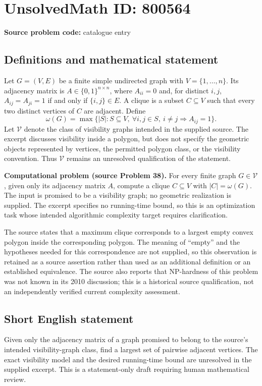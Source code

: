 \documentclass[11pt]{article}
\begin{document}
\section*{UnsolvedMath ID: 800564}
\textbf{Source problem code:} catalogue entry
\subsection{Definitions and mathematical statement}
Let \(G=(V,E)\) be a finite simple undirected graph with \(V=\{1,\ldots,n\}\). Its adjacency matrix is \(A\in\{0,1\}^{n\times n}\), where \(A_{ii}=0\) and, for distinct \(i,j\), \(A_{ij}=A_{ji}=1\) if and only if \(\{i,j\}\in E\). A clique is a subset \(C\subseteq V\) such that every two distinct vertices of \(C\) are adjacent. Define
\[
\omega(G)=\max\bigl\{|S|:S\subseteq V,\ \forall i,j\in S,\ i\ne j\Longrightarrow A_{ij}=1\bigr\}.
\]
Let \(\mathcal V\) denote the class of visibility graphs intended in the supplied source. The excerpt discusses visibility inside a polygon, but does not specify the geometric objects represented by vertices, the permitted polygon class, or the visibility convention. Thus \(\mathcal V\) remains an unresolved qualification of the statement.

\textbf{Computational problem (source Problem 38).} For every finite graph \(G\in\mathcal V\), given only its adjacency matrix \(A\), compute a clique \(C\subseteq V\) with \(|C|=\omega(G)\). The input is promised to be a visibility graph; no geometric realization is supplied. The excerpt specifies no running-time bound, so this is an optimization task whose intended algorithmic complexity target requires clarification.

The source states that a maximum clique corresponds to a largest empty convex polygon inside the corresponding polygon. The meaning of ``empty'' and the hypotheses needed for this correspondence are not supplied, so this observation is retained as a source assertion rather than used as an additional definition or an established equivalence. The source also reports that NP-hardness of this problem was not known in its 2010 discussion; this is a historical source qualification, not an independently verified current complexity assessment.
\subsection{Short English statement}
Given only the adjacency matrix of a graph promised to belong to the source's intended visibility-graph class, find a largest set of pairwise adjacent vertices. The exact visibility model and the desired running-time bound are unresolved in the supplied excerpt. This is a statement-only draft requiring human mathematical review.
\end{document}
